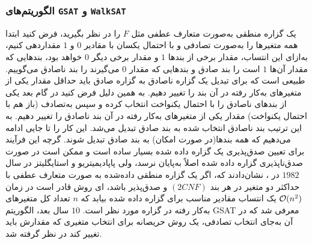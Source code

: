 \subsubsection*{الگوریتم‌های  
\texttt{GSAT}
و 
\texttt{WalkSAT}}
یک گزاره منطقی به‌صورت متعارف عطفی مثل 
$F$
را در نظر بگیرید، فرض کنید ابتدا همه‌ متغیرها را به‌صورت تصادفی  و با احتمال یکسان با مقادیر 
$0$
و 
$1$
مقدار‌دهی‌ کنیم، به‌ازای این انتساب، مقدار برخی از بندها 
$1$
 و مقدار برخی دیگر
$0$
خواهد بود، بندهایی که مقدار  آن‌ها 
$1$
است را بند صادق و  بندهایی که مقدار 
$0$
می‌گیرند را بند ناصادق می‌گوییم.  طبیعی است که برای تبدیل  یک گزاره ناصادق به گزاره صادق باید حداقل مقدار یکی از متغیرهای به‌کار رفته در آن بند‌ را تغییر دهیم. به همین دلیل فرض کنید در گام بعد یکی از بندهای ناصادق را با احتمال یکنواخت انتخاب کرده و سپس به‌تصادف (باز هم با احتمال یکنواخت) مقدار یکی از متغیرهای به‌کار رفته در آن بند ناصادق را تغییر دهیم. به این ترتیب بند ناصادق انتخاب شده  به بند صادق تبدیل می‌شد. این کار را تا جایی ادامه می‌دهیم که همه بندها(در صورت امکان) به بند صادق تبدیل شوند. گرچه این فرآیند برای تعیین صدق‌پذیری یک گزاره داده شده بسیار ساده  است و ممکن است در صورت صدق‌ناپذیری گزاره داده شده اصلاً به‌پایان نرسد،  ولی  پاپادیمیتریو 
و   استایگلیتز
در  سال  
$1982$
در 
\cite{papadimitriou1982combinatorial}،
نشان‌دادند که،  اگر یک گزاره منطقی داده‌شده به صورت متعارف عطفی با حداکثر دو متغیر در هر بند
$(2CNF)$
  و صدق‌پذیر باشد، ای روش قادر است در زمان 
${\mathcal O}(n^{2})$
یک انتساب  مقادیر مناسب برای گزاره داده شده بیابد که 
$n$
تعداد کل متغیرهای به‌کار رفته در  گزاره مورد نظر است.   
$10$
سال بعد، الگوریتم 
\gls{GSAT}
معرفی شد که در آن به‌جای انتخاب تصادفی، یک روش حریصانه برای انتخاب متغیری که مقدارش باید تغییر کند  در نظر گرفته شد. 

